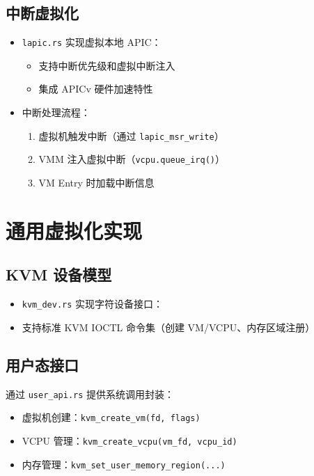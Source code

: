 \documentclass{mancls}
\begin{document}
\subsection{中断虚拟化}
\begin{itemize}
    \item \texttt{lapic.rs} 实现虚拟本地 APIC：
    \begin{itemize}
        \item 支持中断优先级和虚拟中断注入
        \item 集成 APICv 硬件加速特性
    \end{itemize}
    \item 中断处理流程：
    \begin{enumerate}
        \item 虚拟机触发中断（通过 \texttt{lapic\_msr\_write}）
        \item VMM 注入虚拟中断（\texttt{vcpu.queue\_irq()}）
        \item VM Entry 时加载中断信息
    \end{enumerate}
\end{itemize}

\section{通用虚拟化实现}
\subsection{KVM 设备模型}
\begin{itemize}
    \item \texttt{kvm\_dev.rs} 实现字符设备接口：

    \item 支持标准 KVM IOCTL 命令集（创建 VM/VCPU、内存区域注册）
\end{itemize}

\subsection{用户态接口}
通过 \texttt{user\_api.rs} 提供系统调用封装：
\begin{itemize}
    \item 虚拟机创建：\texttt{kvm\_create\_vm(fd, flags)}
    \item VCPU 管理：\texttt{kvm\_create\_vcpu(vm\_fd, vcpu\_id)}
    \item 内存管理：\texttt{kvm\_set\_user\_memory\_region(...)}
\end{itemize}
\end{document}
